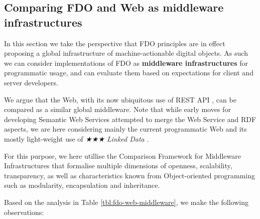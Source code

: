 \documentclass[fleqn,10pt,lineno]{wlpeerj}
\begin{document}
\hypertarget{sec:middleware}{%
\subsection*{Comparing FDO and Web as middleware infrastructures}\label{sec:middleware}}

In this section we take the perspective that FDO principles are in effect proposing a global infrastructure of machine-actionable digital objects. As such we can consider implementations of FDO as \textbf{middleware infrastructures} for programmatic usage, and can evaluate them based on expectations for client and server developers.

We argue that the Web, with its now ubiquitous use of REST API \cite{174AwcFUL}, can be compared as a similar global middleware. Note that while early moves for developing Semantic Web Services \cite{WzPECPDP} attempted to merge the Web Service and RDF aspects, we are here considering mainly the current programmatic Web and its mostly light-weight use of \emph{★★★ Linked Data} \cite{11dInoyVF}.

For this purpose, we here utillise the Comparison Framework for Middleware Infrastructures \cite{hRzcHhPD} that formalise multiple dimensions of openness, scalability, transparency, as well as characteristics known from Object-oriented programming such as modularity, encapsulation and inheritance.




Based on the analysis in Table \ref{tbl:fdo-web-middleware}, we make the following observations:
\end{document}
